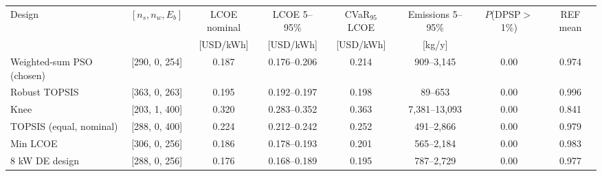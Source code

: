 \begin{tabular}{lccccccc}
\toprule
Design & $[n_s, n_w, E_b]$ & LCOE nominal & LCOE 5--95\% & CVaR$_{95}$ LCOE & Emissions 5--95\% & $P$(DPSP$>$1\%) & REF mean\\
 & & [USD/kWh] & [USD/kWh] & [USD/kWh] & [kg/y] & & \\
\midrule
Weighted-sum PSO (chosen) & [290, 0, 254] & 0.187 & 0.176--0.206 & 0.214 & 909--3,145 & 0.00 & 0.974\\
Robust TOPSIS & [363, 0, 263] & 0.195 & 0.192--0.197 & 0.198 & 89--653 & 0.00 & 0.996\\
Knee & [203, 1, 400] & 0.320 & 0.283--0.352 & 0.363 & 7,381--13,093 & 0.00 & 0.841\\
TOPSIS (equal, nominal) & [288, 0, 400] & 0.224 & 0.212--0.242 & 0.252 & 491--2,866 & 0.00 & 0.979\\
Min LCOE & [306, 0, 256] & 0.186 & 0.178--0.193 & 0.201 & 565--2,184 & 0.00 & 0.983\\
8 kW DE design & [288, 0, 256] & 0.176 & 0.168--0.189 & 0.195 & 787--2,729 & 0.00 & 0.977\\
\bottomrule
\end{tabular}
